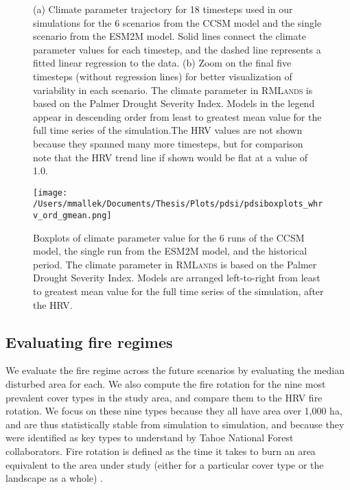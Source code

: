 \documentclass[12pt]{article}
\begin{document}
\begin{spacing}{1}
\begin{figure}[!htbp]
\centering
\label{pdsi-final5}
\caption{(a) Climate parameter trajectory for 18 timesteps used in our simulations for the 6 scenarios from the CCSM model and the single scenario from the ESM2M model. Solid lines connect the climate parameter values for each timestep, and the dashed line represents a fitted linear regression to the data. (b) Zoom on the final five timesteps (without regression lines) for better visualization of variability in each scenario. The climate parameter in \textsc{RMLands} is based on the Palmer Drought Severity Index. Models in the legend appear in descending order from least to greatest mean value for the full time series of the simulation.The HRV values are not shown because they spanned many more timesteps, but for comparison note that the HRV trend line if shown would be flat at a value of 1.0. 
}

\end{figure}



\begin{figure}[!htbp]
\centering
\texttt{[image: /Users/mmallek/Documents/Thesis/Plots/pdsi/pdsiboxplots\_whrv\_ord\_gmean.png]}
\caption{Boxplots of climate parameter value for the 6 runs of the CCSM model, the single run from the ESM2M model, and the historical period.  The climate parameter in \textsc{RMLands} is based on the Palmer Drought Severity Index. Models are arranged left-to-right from least to greatest mean value for the full time series of the simulation, after the HRV.}
\label{pdsi-boxplots}
\end{figure}


\subsection*{Evaluating fire regimes}
We evaluate the fire regime across the future scenarios by evaluating the median disturbed area for each. We also compute the fire rotation for the nine most prevalent cover types in the study area, and compare them to the HRV fire rotation. We focus on these nine types because they all have area over 1,000 ha, and are thus statistically stable from simulation to simulation, and because they were identified as key types to understand by Tahoe National Forest collaborators. Fire rotation is defined as the time it takes to burn an area equivalent to the area under study (either for a particular cover type or the landscape as a whole) \citep{Agee1993}.



\end{spacing}
\end{document}
